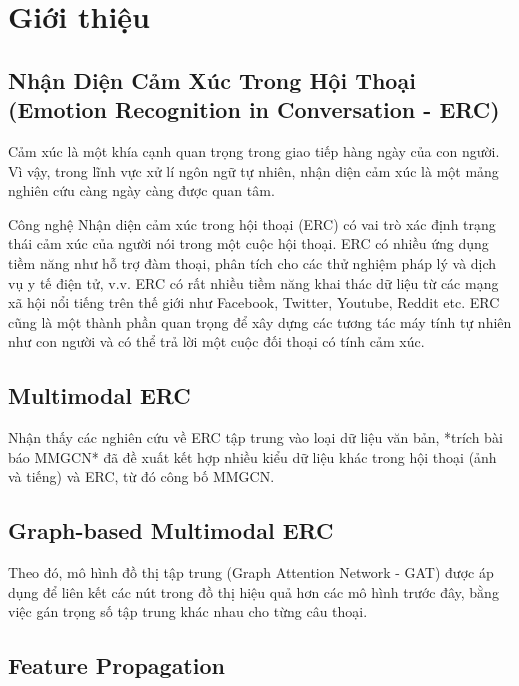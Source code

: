 \chapter{Giới thiệu}
\label{chap:Giới thiệu}



\section{Nhận Diện Cảm Xúc Trong Hội Thoại (Emotion Recognition in Conversation - ERC)}
\label{sec:Nhận Diện Cảm Xúc Trong Hội Thoại (Emotion Recognition in Conversation - ERC)}

Cảm xúc là một khía cạnh quan trọng trong giao tiếp hàng ngày của con người. 
Vì vậy, trong lĩnh vực xử lí ngôn ngữ tự nhiên, nhận diện cảm xúc là một mảng nghiên cứu càng ngày càng được quan tâm. 

Công nghệ Nhận diện cảm xúc trong hội thoại (ERC) có vai trò xác định trạng thái cảm xúc của người nói trong một cuộc hội thoại. 
ERC có nhiều ứng dụng tiềm năng như hỗ trợ đàm thoại, phân tích cho các thử nghiệm pháp lý và dịch vụ y tế điện tử, v.v.
ERC có rất nhiều tiềm năng khai thác dữ liệu từ các mạng xã hội nổi tiếng trên thế giới như Facebook, Twitter, Youtube, Reddit etc. 
ERC cũng là một thành phần quan trọng để xây dựng các tương tác máy tính tự nhiên như con người và có thể trả lời một cuộc đối thoại có tính cảm xúc.


\section{Multimodal ERC}
\label{sec:Multimodal ERC}

Nhận thấy các nghiên cứu về ERC tập trung vào loại dữ liệu văn bản, *trích bài báo MMGCN* đã đề xuất kết hợp nhiều kiểu dữ liệu khác trong hội thoại (ảnh và tiếng) và ERC, từ đó công bố MMGCN. 

\section{Graph-based Multimodal ERC}
\label{chap:Graph-based Multimodal ERC}

Theo đó, mô hình đồ thị tập trung (Graph Attention Network - GAT) được áp dụng để liên kết các nút trong đồ thị hiệu quả hơn các mô hình trước đây, bằng việc gán trọng số tập trung khác nhau cho từng câu thoại. 

\section{Feature Propagation}
\label{sec:Feature Propagation}


